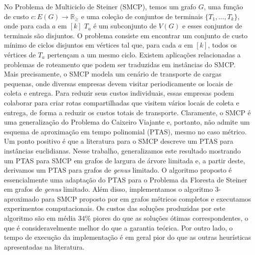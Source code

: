 
No Problema de Multiciclo de Steiner (SMCP), temos um grafo \(G\), uma função de custo $c \colon E(G) \to \mathbb{R}_\ge$ e uma coleção de conjuntos de terminais \(\{T_1, \dots , T_k\}\), onde para cada \(a\) em \([k]\) \(T_a\) é um subconjunto de \(V(G)\) e esses conjuntos de terminais são disjuntos. O problema consiste em encontrar um conjunto de custo mínimo de ciclos disjuntos em vértices tal que, para cada \(a\) em \([k]\), todos os vértices de \(T_a\) pertençam a um mesmo ciclo.
Existem aplicações relacionadas a problemas de roteamento que podem ser traduzidas em instâncias do SMCP.
Mais precisamente, o SMCP modela um cenário de transporte de cargas pequenas, onde diversas empresas devem visitar periodicamente os locais de coleta e entrega.
Para reduzir seus custos individuais, essas empresas podem colaborar para criar rotas compartilhadas que visitem vários locais de coleta e entrega, de forma a reduzir os custos totais de transporte.
Claramente, o SMCP é uma generalização do Problema do Caixeiro Viajante e, portanto, não admite um esquema de aproximação em tempo polinomial (PTAS), mesmo no caso métrico.
Um ponto positivo é que a literatura para o SMCP descreve um PTAS para instâncias euclidianas. Nesse trabalho, generalizamos este resultado mostrando um PTAS para SMCP em grafos de largura de árvore limitada e, a partir deste, derivamos um PTAS para grafos de \textit{genus} limitado.
O algoritmo proposto é essencialmente uma adaptação do PTAS para o Problema da Floresta de Steiner em grafos de \textit{genus} limitado.
Além disso, implementamos o algoritmo 3-aproximado para SMCP proposto por \cite{smcp_3apx} em grafos métricos completos e executamos experimentos computacionais.
Os custos das soluções produzidas por este algoritmo são em média \(34\%\) piores do que as soluções ótimas correspondentes, o que é consideravelmente melhor do que a garantia teórica.
Por outro lado, o tempo de execução da implementação é em geral pior do que as outras heurísticas apresentadas na literatura.
\hfill\\

